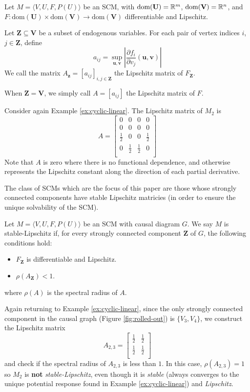 \documentclass[12pt]{article}
\begin{document}
\begin{definition}\label{defn:lipschitz}
Let $M=\langle V,U,F,P(U)\rangle$ be an SCM, with $\text{dom}(\mathbf{U})=\mathbb{R}^m$, $\text{dom}(\mathbf{V})=\mathbb{R}^n$, and $F:\text{dom}(\mathbf{U})\times \text{dom}(\mathbf{V})\to\text{dom}(\mathbf{V})$ differentiable and Lipschitz.

Let $\mathbf{Z}\subseteq\mathbf{V}$ be a subset of endogenous variables.
For each pair of vertex indices $i$, $j\in\mathbf{Z}$, define
\[
a_{ij} = \sup_{\mathbf{u},\mathbf{v}} \left\lvert\frac{\partial f_i}{\partial v_j}(\mathbf{u},\mathbf{v})\right\rvert
\]
We call the matrix $A_{\mathbf{z}}=[a_{ij}]_{i,j\in\mathbf{Z}}$ the Lipschitz matrix of $F_\mathbf{Z}$.

When $\mathbf{Z}=\mathbf{V}$, we simply call $A=[a_{ij}]$ the Lipschitz matrix of $F$.
\end{definition}

Consider again Example \ref{ex:cyclic-linear}. The Lipschitz matrix of $M_2$ is 
\[
A =
\begin{bmatrix}
0 & 0 & 0 & 0 \\
0 & 0 & 0 & 0 \\
\frac{1}{2} & 0 & 0 & \frac{1}{2} \\
0 & \frac{1}{2} & \frac{1}{2} & 0 \\
\end{bmatrix}
\]
Note that $A$ is zero where there is no functional dependence, and otherwise represents the Lipschitz constant along the direction of each partial derivative.

The class of SCMs which are the focus of this paper are those whose strongly connected components have stable Lipschitz matricies (in order to ensure the unique solvability of the SCM).

\begin{definition}\label{stable-Lipschitz}
Let $M=\langle V,U,F,P(U)\rangle$ be an SCM with causal diagram $G$. 
We say $M$ is stable-Lipschitz if, for every strongly connected component $\mathbf{Z}$ of $G$, the following conditions hold:
\begin{itemize}
  \item $F_{\mathbf{Z}}$ is differentiable and Lipschitz.
  \item $\rho(A_\mathbf{Z})<1$.
\end{itemize}
where $\rho(A)$ is the spectral radius of $A$.
\end{definition}

Again returning to Example \ref{ex:cyclic-linear}, since the only strongly connected component in the causal graph (Figure \ref{fig:rolled-out}) is $\{V_3,V_4\}$, we construct the Lipschitz matrix
\[
A_{2,3} =
\begin{bmatrix}
\frac{1}{2} & \frac{1}{2} \\
\frac{1}{2} & \frac{1}{2} \\
\end{bmatrix}
\]
and check if the spectral radius of $A_{2,3}$ is less than $1$. In this case, $\rho(A_{2,3})=1$ so $M_2$ is \textbf{not} \emph{stable-Lipschitz}, even though it is \emph{stable} (always converges to the unique potential response found in Example \ref{ex:cyclic-linear}) and \emph{Lipschitz}.
\end{document}
